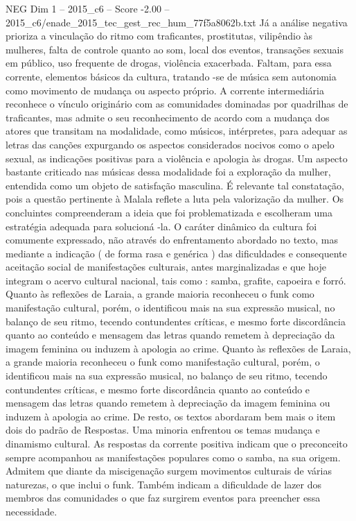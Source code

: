 \begin{textsample}{NEG Dim 1 – 2015\_c6 – Score -2.00 – 2015\_c6/enade\_2015\_tec\_gest\_rec\_hum\_77f5a8062b.txt}
Já a análise negativa prioriza a vinculação do ritmo com traficantes, prostitutas, vilipêndio às mulheres, falta de controle quanto ao som, local dos eventos, transações sexuais em público, uso frequente de drogas, violência exacerbada.
Faltam, para essa corrente, elementos básicos da cultura, tratando -se de música sem autonomia como movimento de mudança ou aspecto próprio.
A corrente intermediária reconhece o vínculo originário com as comunidades dominadas por quadrilhas de traficantes, mas admite o seu reconhecimento de acordo com a mudança dos atores que transitam na modalidade, como músicos, intérpretes, para adequar as letras das canções expurgando os aspectos considerados nocivos como o apelo sexual, as indicações positivas para a violência e apologia às drogas.
Um aspecto bastante criticado nas músicas dessa modalidade foi a exploração da mulher, entendida como um objeto de satisfação masculina.
É relevante tal constatação, pois a questão pertinente à Malala reflete a luta pela valorização da mulher.
Os concluintes compreenderam a ideia que foi problematizada e escolheram uma estratégia adequada para solucioná -la.
O caráter dinâmico da cultura foi comumente expressado, não através do enfrentamento abordado no texto, mas mediante a indicação ( de forma rasa e genérica ) das dificuldades e consequente aceitação social de manifestações culturais, antes marginalizadas e que hoje integram o acervo cultural nacional, tais como : samba, grafite, capoeira e forró.
Quanto às reflexões de Laraia, a grande maioria reconheceu o funk como manifestação cultural, porém, o identificou mais na sua expressão musical, no balanço de seu ritmo, tecendo contundentes críticas, e mesmo forte discordância quanto ao conteúdo e mensagem das letras quando remetem à depreciação da imagem feminina ou induzem à apologia ao crime.
Quanto às reflexões de Laraia, a grande maioria reconheceu o funk como manifestação cultural, porém, o identificou mais na sua expressão musical, no balanço de seu ritmo, tecendo contundentes críticas, e mesmo forte discordância quanto ao conteúdo e mensagem das letras quando remetem à depreciação da imagem feminina ou induzem à apologia ao crime.
De resto, os textos abordaram bem mais o item dois do padrão de Respostas.
Uma minoria enfrentou os temas mudança e dinamismo cultural.
As respostas da corrente positiva indicam que o preconceito sempre acompanhou as manifestações populares como o samba, na sua origem.
Admitem que diante da miscigenação surgem movimentos culturais de várias naturezas, o que inclui o funk.
Também indicam a dificuldade de lazer dos membros das comunidades o que faz surgirem eventos para preencher essa necessidade.

\end{textsample}

